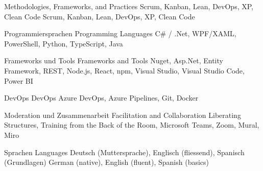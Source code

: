 {
}


\begin{cvskills}
	\cvskill
	{
		{Methodologies, Frameworks, and Practices}
	} %
	{
		{
			Scrum, Kanban, Lean, DevOps, XP, Clean Code
		}
		{
			Scrum, Kanban, Lean, DevOps, XP, Clean Code
		}
	} %

  \cvskill
    {
    		{ Programmiersprachen	}
    		{ Programming Languages }
    } %
    {C\# / .Net, WPF/XAML, PowerShell, Python, TypeScript, Java} %

  \cvskill
    {
    		{ Frameworks und Tools }
    		{ Frameworks and Tools }
    } %
    {Nuget, Asp.Net, Entity Framework, REST, Node.js, React, npm, Visual Studio, \linebreak
    	Visual Studio Code, Power BI} %

  \cvskill
    {
    		{ DevOps }
    		{ DevOps }
    } %
    {Azure DevOps, Azure Pipelines, Git, Docker} %

  \cvskill
	{
			{ Moderation und Zusammenarbeit }
			{ Facilitation and Collaboration }
	} %
	{Liberating Structures, Training from the Back of the Room, Microsoft Teams, Zoom, \linebreak
		Mural, Miro} %

  \cvskill
    {
    		{ Sprachen }
    		{ Languages }
    } %
    {
    		{ Deutsch (Muttersprache), Englisch (fliessend), Spanisch (Grundlagen) }
    		{ German (native), English (fluent), Spanish (basics) }
    } %

\end{cvskills}
